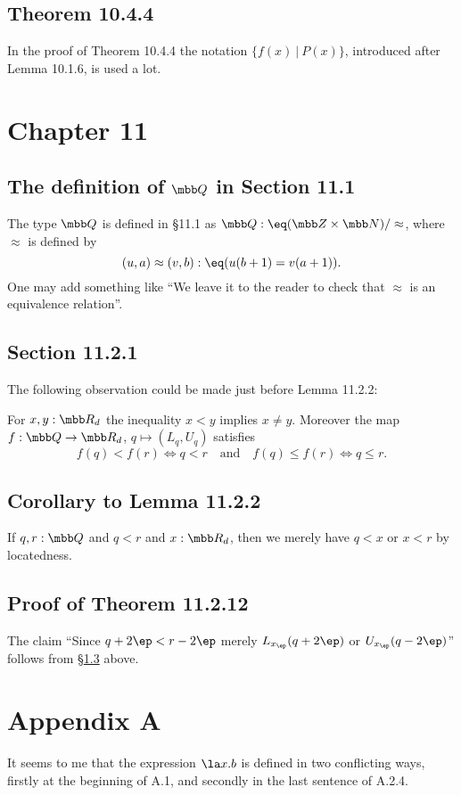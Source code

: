 \documentclass[12pt]{article}
\begin{document}

\subsection{Theorem 10.4.4}

In the proof of Theorem 10.4.4 the notation $\{f(x)\ \vert\ P(x)\}$, introduced after Lemma 10.1.6, is used a lot.


\section{Chapter 11}

\subsection[The definition of Q in Section 11.1]{The definition of $\mbb Q$ in Section 11.1}

The type $\mbb Q$ is defined in \S11.1 as $\mbb Q:\eq(\mbb Z\times\mbb N)/\approx$, where $\approx$ is defined by 
$$
(u,a)\approx(v,b):\eq(u(b+1)=v(a+1)).
$$ 
One may add something like ``We leave it to the reader to check that $\approx$ is an equivalence relation''.


\subsection{Section 11.2.1}

The following observation could be made just before Lemma 11.2.2: 

For $x,y:\mbb R_d$ the inequality $x<y$ implies $x\neq y$. Moreover the map $f:\mbb Q\to\mbb R_d$, $q\mapsto(L_q,U_q)$ satisfies
$$
f(q)<f(r)\iff q<r\quad\text{and}\quad f(q)\le f(r)\iff q\le r.
$$ 


\subsection{Corollary to Lemma 11.2.2}\label{1122}

If $q,r:\mbb Q$ and $q<r$ and $x:\mbb R_d$, then we merely have $q<x$ or $x<r$ by locatedness.

\subsection{Proof of Theorem 11.2.12}

The claim ``Since $q+2\ep<r-2\ep$ merely $L_{x_\ep}(q+2\ep)$ or $U_{x_\ep}(q-2\ep)$'' follows from \S\ref{1122} above.


\section{Appendix A}

It seems to me that the expression $\la x.b$ is defined in two conflicting ways, firstly at the beginning of A.1, and secondly in the last sentence of A.2.4. 
\end{document}
